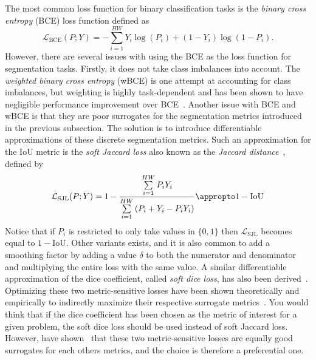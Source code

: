 The most common loss function for binary classification tasks is the \textit{binary cross entropy} (BCE) loss function defined as
%
\begin{equation*}
  \mathcal{L}_{\mathrm{BCE}}(P; Y)
  =
  - \sum\limits_{i = 1}^{HW}
  Y_i \log{(P_i)}
  +
  (1 - Y_i) \log{(1 - P_i)}.
\end{equation*}
%
However, there are several issues with using the BCE as the loss function for segmentation tasks.
Firstly, it does not take class imbalances into account.
The \textit{weighted binary cross entropy} (wBCE) is one attempt at accounting for class imbalances, but weighting is highly task-dependent and has been shown to have negligible performance improvement over BCE~\cite[p.~98]{soft-losses}.
Another issue with BCE and wBCE is that they are poor surrogates for the segmentation metrics introduced in the previous subsection.
The solution is to introduce differentiable approximations of these discrete segmentation metrics.
Such an approximation for the IoU metric is the \textit{soft Jaccard loss} also known as the \textit{Jaccard distance}~\cite{jaccard-loss-with-equation}, defined by
%
\begin{equation*}
  \mathcal{L}_{\mathrm{SJL}}(P; Y)
  =
  1
  -
  \frac{%
    \sum\limits_{i = 1}^{HW}
    P_i Y_i
  }{%
    \sum\limits_{i = 1}^{HW} \left(
      P_i
      +
      Y_i
      -
      P_i Y_i
    \right)
  }
  \appropto
  1 - \mathrm{IoU}
\end{equation*}
%
Notice that if $P_i$ is restricted to only take values in $\{0, 1\}$ then $\mathcal{L}_{\mathrm{SJL}}$ becomes equal to $1 - \mathrm{IoU}$.
Other variants exists, and it is also common to add a smoothing factor by adding a value $\delta$ to both the numerator and denominator and multiplying the entire loss with the same value.
A similar differentiable approximation of the dice coefficient, called \textit{soft dice loss}, has also been derived~\cite{original-soft-dice-loss}.
Optimizing these two metric-sensitive losses have been shown theoretically and empirically to indirectly maximize their respective surrogate metrics~\cite{soft-losses}.
You would think that if the dice coefficient has been chosen as the metric of interest for a given problem, the soft dice loss should be used instead of soft Jaccard loss.
However, \citeauthor{soft-losses} have shown~\cite{soft-losses} that these two metric-sensitive losses are equally good surrogates for each others metrics, and the choice is therefore a preferential one.

